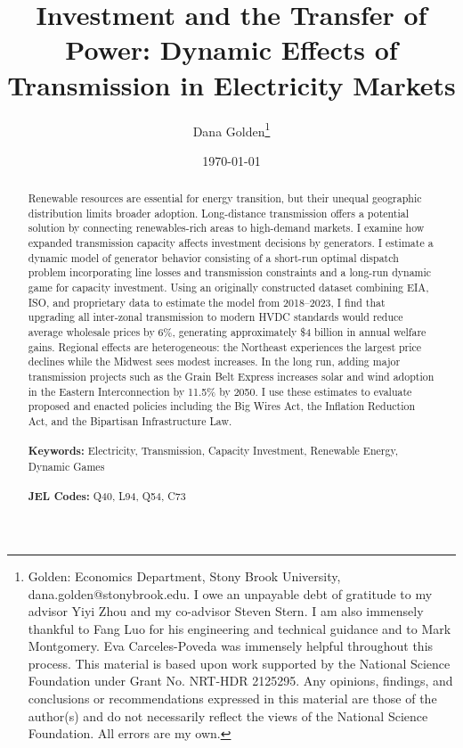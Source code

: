 \documentclass[12pt]{article}
\begin{document}
\begin{titlepage}
\title{Investment and the Transfer of Power: Dynamic Effects of Transmission in Electricity Markets} \author{Dana Golden\thanks{Golden: Economics Department, Stony Brook University, dana.golden@stonybrook.edu. I owe an unpayable debt of gratitude to my advisor Yiyi Zhou and my co-advisor Steven Stern. I am also immensely thankful to Fang Luo for his engineering and technical guidance and to Mark Montgomery. Eva Carceles-Poveda was immensely helpful throughout this process. This material is based upon work supported by the
National Science Foundation under Grant No. NRT-HDR 2125295. Any opinions,
findings, and conclusions or recommendations expressed in this material are those of
the author(s) and do not necessarily reflect the views of the National Science
Foundation.
All errors are my own.}}
\date{\today}
\maketitle
\begin{abstract}
\noindent Renewable resources are essential for energy transition, but their unequal geographic distribution limits broader adoption. Long-distance transmission offers a potential solution by connecting renewables-rich areas to high-demand markets. I examine how expanded transmission capacity affects investment decisions by generators. I estimate a dynamic model of generator behavior consisting of a short-run optimal dispatch problem incorporating line losses and transmission constraints and a long-run dynamic game for capacity investment. Using an originally constructed dataset combining EIA, ISO, and proprietary data to estimate the model from 2018--2023, I find that upgrading all inter-zonal transmission to modern HVDC standards would reduce average wholesale prices by 6\%, generating approximately \$4 billion in annual welfare gains. Regional effects are heterogeneous: the Northeast experiences the largest price declines while the Midwest sees modest increases. In the long run, adding major transmission projects such as the Grain Belt Express increases solar and wind adoption in the Eastern Interconnection by 11.5\% by 2050. I use these estimates to evaluate proposed and enacted policies including the Big Wires Act, the Inflation Reduction Act, and the Bipartisan Infrastructure Law.\\
\vspace{0in}\\
\noindent\textbf{Keywords:} Electricity, Transmission, Capacity Investment, Renewable Energy, Dynamic Games\\
\vspace{0in}\\
\noindent\textbf{JEL Codes:} Q40, L94, Q54, C73\\


\end{abstract}
\end{titlepage}
\end{document}
